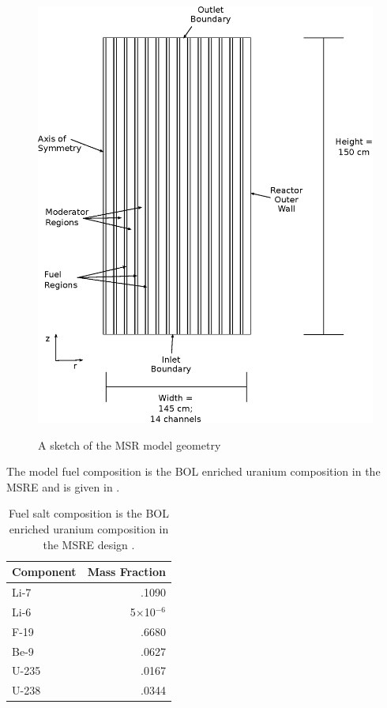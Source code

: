 \documentclass{article}
\begin{document}
\begin{figure}[htpb]
  \centering
  \includegraphics{geometry.eps}
  \label{fig:geom}
  \caption{A sketch of the \gls{MSR} model geometry}
\end{figure}


The model fuel composition is the \gls{BOL} enriched uranium composition in the 
\gls{MSRE} and is given in  \cite{robertson_msre_1965}.


\begin{table}[htpb]
  \begin{center}
    \begin{tabular}{l | r}
      Component & Mass Fraction\\\hline\hline
      Li-7 & .1090\\
      Li-6 & 5$\times$10$^{-6}$\\
      F-19 & .6680\\
      Be-9 & .0627\\
      U-235 & .0167\\
      U-238 & .0344\\
    \end{tabular}
  \end{center}
        \caption{Fuel salt composition is the \gls{BOL} enriched
        uranium composition in the \gls{MSRE} design
        \cite{robertson_msre_1965}.}
  \label{table:comp}
\end{table}
\end{document}
